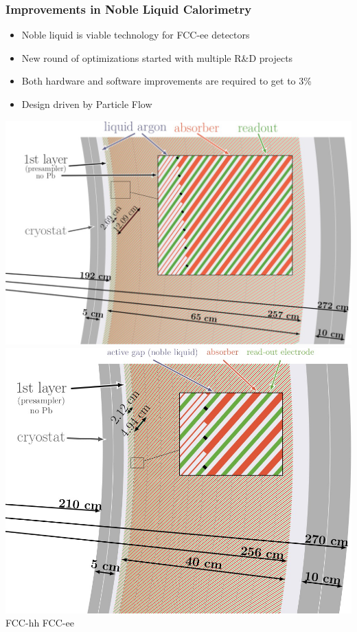 \documentclass[aspectratio=169]{beamer}
\begin{document}
\begin{frame}
  \frametitle{Improvements in Noble Liquid Calorimetry}

  \begin{itemize}
    \item Noble liquid is viable technology for FCC-ee detectors
    \item New round of optimizations started with multiple R\&D projects
    \item Both hardware and software improvements are required to get to 3\%
    \item Design driven by Particle Flow
  \end{itemize}

  \vspace{-1.5em}
  \begin{center}
    \includegraphics[align=c,width=0.47\linewidth]{figures/FCC_hh_LAr_diagram.png}%
    \hfill
    \includegraphics[align=c,width=0.47\linewidth]{figures/FCC_ee_LAr_diagram.png}\\[.5em]
    FCC-hh \hspace{16em} FCC-ee
  \end{center}
\end{frame}
\end{document}
